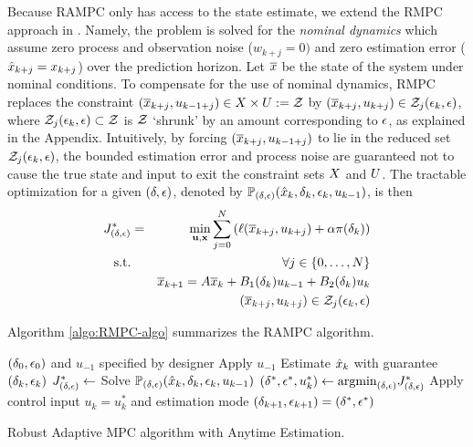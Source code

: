 Because RAMPC only has access to the state estimate, we extend the RMPC approach in \cite{richardsetal05rmp, chiscietal01swp}.
Namely, the problem is solved for the \emph{nominal dynamics} which assume zero process and observation noise ($w_{k+j} = 0)$ and zero estimation error ($\hat{x}_{k+j}=x_{k+j}$) over the prediction horizon.
Let $\overline{x}$ be the state of the system under nominal conditions.
To compensate for the use of nominal dynamics, RMPC replaces the constraint $(\overline{x}_{k+j},u_{k-1+j}) \in X \times U := \mathcal{Z}$ 
by $(\overline{x}_{k+j},u_{k+j}) \in \mathcal{Z}_{j}(\epsilon_k,\epsilon)$,
where $\mathcal{Z}_{j}(\epsilon_k,\epsilon) \subset \mathcal{Z}$ is $\mathcal{Z}$ `shrunk' by an amount corresponding to $\epsilon$, as explained in the Appendix.
Intuitively, by forcing $(\overline{x}_{k+j},u_{k-1+j})$ to lie in the reduced set $\mathcal{Z}_{j}(\epsilon_k,\epsilon)$, the bounded estimation error and process noise are guaranteed not to cause the true state and input to exit the constraint sets $X$ and $U$.
%
The tractable optimization for a given $(\delta,\epsilon)$, denoted by $\mathbb{P}_{(\delta,\epsilon)}(\hat{x}_{k},\delta_{k},\epsilon_{k},u_{k -1})$, is then 
\begin{eqnarray}
\label{eq:tractableOptim}
J^*_{(\delta,\epsilon)} &=& \min_{\mathbf{u},\mathbf{x}}\sum_{j=0}^{N}\left(\ell(\overline{x}_{k+j},u_{k+j})+\alpha\pi(\delta_k)\right)
\\
\textrm{s.t.} &&\forall j \in \{0,\ldots,N\}
\nonumber
\\
&&\overline{x}_{k+1}=A \overline{x}_{k}+B_{1}(\delta_k)u_{k-1}+B_{2}(\delta_k)u_{k}
\nonumber
\\
&& (\overline{x}_{k+j},u_{k+j}) \in \mathcal{Z}_{j}(\epsilon_k,\epsilon)
\nonumber
\end{eqnarray}

Algorithm \ref{algo:RMPC-algo} summarizes the RAMPC algorithm.
\begin{algorithm}
	\begin{algorithmic}[1]
		\State $(\delta_{0},\epsilon_{0})$ and $u_{-1}$ specified by designer
		\State Apply $u_{-1}$
		\State Estimate $\hat{x}_{k}$ with guarantee $\left(\delta_k, \epsilon_k\right)$
		\State $J_{(\delta,\epsilon)}^* \leftarrow $ Solve $\mathbb{P}_{(\delta,\epsilon)}(\hat{x}_{k},\delta_{k},\epsilon_{k},u_{k -1})$		
		\EndFor
		\State $( \delta^{*}, \epsilon^{*}, u_{k }^{*} ) \gets \text{argmin}_{(\delta,\epsilon)} J_{(\delta,\epsilon)}^*$
		\State Apply control input $u_{k} = u_{k}^{*}$ and estimation mode $(\delta_{k+1},\epsilon_{k+1}) = \left( \delta^{*}, \epsilon^{*} \right)$
		\EndFor
	\end{algorithmic} 
	
	\caption{Robust Adaptive MPC algorithm with Anytime Estimation.}
	\label{algo:RMPC-algo}
\end{algorithm}

